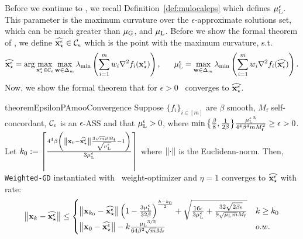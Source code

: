 Before we continue to \PAMOO, we recall Definition~\ref{def:mulocaleps} which defines ${\mu_{\mathrm{L}}^\epsilon}$. This parameter is the maximum curvature over the $\epsilon$-approximate solutions set, which can be much greater than ${\mu_{\mathrm{G}}}$, and ${\mu_{\mathrm{L}}}$. Before we show the formal theorem of \PAMOO, we define $\widehat{{{\mathbf{x}}_\star^\epsilon}} \in \mathcal{C}_\epsilon$ which is the point with the maximum curvature, s.t.
\begin{align*}
    \widehat{{{\mathbf{x}}_\star^\epsilon}} = \arg\max_{{{\mathbf{x}}_\star^\epsilon} \in \mathcal{C}_\epsilon} \max_{{\mathbf{w}} \in \Delta_m} \lambda_{\min}\left(\sum_{i=1}^m w_i \nabla^2 f_i({{\mathbf{x}}_\star^\epsilon}) \right), ~~~~~ {\mu_{\mathrm{L}}^\epsilon} =  \max_{{\mathbf{w}} \in \Delta_m} \lambda_{\min}\left(\sum_{i=1}^m w_i \nabla^2 f_i(\widehat{{{\mathbf{x}}_\star^\epsilon}}) \right).
\end{align*}
Now, we show the formal theorem that for $\epsilon>0$ \PAMOO ~converges to $\widehat{{{\mathbf{x}}_\star^\epsilon}}$.
\begin{restatable}{theorem}{EpsilonPAmooConvergence}
\label{thm:epsilon_pamoo_convergence}
    Suppose $\{f_i\}_{i\in [m]}$ are $\beta$ smooth, $M_{\mathrm{f}}$ self-concordant, $\mathcal{C}_\epsilon$ is an $\epsilon$-ASS and that ${\mu_{\mathrm{L}}^\epsilon} > 0$, where $\min \big\{ \frac{\beta}{8} , \frac{1}{2 \beta} \big\} \frac{{\mu_{\mathrm{L}}^\epsilon}^3}{4^4 \beta^4 m M_{\mathrm{f}}^2}\geq \epsilon > 0$. Let $k_0 := \left\lceil \frac{4^4  \beta  \left(\left\Vert{\mathbf{x}}_0 - \widehat{{{\mathbf{x}}_\star^\epsilon}}\right\Vert \frac{3\sqrt{m}\beta M_{\mathrm{f}}}{\sqrt{{\mu_{\mathrm{L}}^\epsilon} }} -1\right) }{ 3{\mu_{\mathrm{L}}^\epsilon}}\right\rceil$ where $\left\Vert\cdot\right\Vert$ is the Euclidean-norm. Then, \texttt{Weighted-GD} instantiated with \PAMOO\ weight-optimizer and $\eta = 1$  converges to $\widehat{{{\mathbf{x}}_\star^\epsilon}}$ with rate:
    \begin{align*}
        \left\Vert{\mathbf{x}}_{k} - \widehat{{{\mathbf{x}}_\star^\epsilon}}\right\Vert \leq 
        \begin{cases}
            \left\Vert{\mathbf{x}}_{k_0} - \widehat{{{\mathbf{x}}_\star^\epsilon}}\right\Vert \left(1-\frac{3{\mu_{\mathrm{L}}^\epsilon}}{32\beta}\right)^\frac{k-k_0}{2} + \sqrt{\frac{16\epsilon}{3{\mu_{\mathrm{L}}^\epsilon}}+\frac{32 \sqrt{2\beta \epsilon}}{9 \sqrt{{\mu_{\mathrm{L}}} m} M_{\mathrm{f}}}}  & k\geq k_0\\
            \left\Vert{\mathbf{x}}_0 - \widehat{{{\mathbf{x}}_\star^\epsilon}}\right\Vert- k \frac{{\mu_{\mathrm{L}}}^{3/2}}{64 \beta^2 \sqrt{m} M_{\mathrm{f}}} & o.w.
        \end{cases}
    \end{align*}
\end{restatable}

